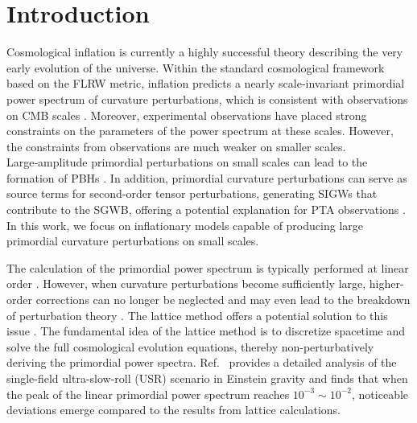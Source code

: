 \documentclass[reprint, 10pt, amsmath, amssymb, floatfix, aps, prd, superscriptaddress, nofootinbib, nobibnotes,twocolumn]{revtex4-1}
\begin{document}
\section{Introduction}
\label{sec:intro}
Cosmological inflation is currently a highly successful theory describing the very early evolution of the universe. Within the standard cosmological framework based on the \ac{FLRW} metric, inflation predicts a nearly scale-invariant primordial power spectrum of curvature perturbations, which is consistent with observations on \ac{CMB} scales \cite{Planck:2018vyg}. Moreover, experimental observations have placed strong constraints on the parameters of the power spectrum at these scales. However, the constraints from observations are much weaker on smaller scales. Large‑amplitude primordial perturbations on small scales can lead to the formation of \acp{PBH} \cite{Kawai:2021edk,Carr:2020xqk,Saito:2008jc,Garcia-Bellido:2017aan,Bartolo:2018evs,Ferrante:2022mui,LISACosmologyWorkingGroup:2023njw,Iovino:2024tyg,DeLuca:2020agl,Choudhury:2023rks,Fang:2025vhi,Pi:2026uxd,Allegrini:2026jqt,Wang:2026sgz,Bi:2026zlt}. In addition, primordial curvature perturbations can serve as source terms for second‑order tensor perturbations, generating \acp{SIGW} that contribute to the \ac{SGWB}, offering a potential explanation for \ac{PTA} observations \cite{Domenech:2021ztg,Chang:2023aba,Cai:2018dig,Baumann:2007zm,Ananda:2006af,NANOGrav:2023hvm,Franciolini:2023pbf,Vaskonen:2020lbd,Wang:2023ost,Domenech:2025ccu,LISACosmologyWorkingGroup:2025vdz,LISACosmologyWorkingGroup:2024hsc,Chen:2026scy,Bhaumik:2026rzf,Caporali:2026qhc,Zhang:2026hqg,Zhao:2026jax,Domenech:2026nun}. In this work, we focus on inflationary models capable of producing large primordial curvature perturbations on small scales.



The calculation of the primordial power spectrum is typically performed at linear order \cite{Karam:2022nym,Zhou:2020kkf,Ragavendra:2020sop,Ballesteros:2020qam,Cai:2019bmk,Ozsoy:2019lyy,Chen:2019zza,Carrilho:2019oqg,Pi:2021dft,Guzzetti:2016mkm,Malik:2008im,Di:2017ndc,Kim:2025dyi,Huang:2026bwa,Rashidi:2026wtj,Dalianis:2026tty}. However, when curvature perturbations become sufficiently large, higher-order corrections can no longer be neglected and may even lead to the breakdown of perturbation theory \cite{Inomata:2022yte,Davies:2023hhn,Firouzjahi:2023bkt,Braglia:2025cee,Fumagalli:2023loc,Cheng:2023ikq,Firouzjahi:2023btw,Firouzjahi:2023aum,Firouzjahi:2024sce,Fumagalli:2024jzz,Kawaguchi:2024rsv,Choudhury:2024dzw,Choudhury:2024dei}. The lattice method offers a potential solution to this issue \cite{Caravano:2024tlp,Saha:2026cay,Launay:2025lnc,Jamieson:2025ngu}. The fundamental idea of the lattice method is to discretize spacetime and solve the full cosmological evolution equations, thereby non-perturbatively deriving the primordial power spectra. Ref.~\cite{Caravano:2024moy} provides a detailed analysis of the single-field ultra-slow-roll (USR) scenario in Einstein gravity and finds that when the peak of the linear primordial power spectrum reaches $10^{-3} \sim 10^{-2}$, noticeable deviations emerge compared to the results from lattice calculations.
\end{document}

